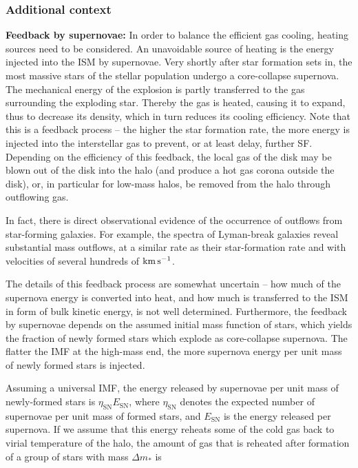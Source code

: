\documentclass[a4paper,10pt]{article}
\begin{document}
\subsubsection{Additional context}

{\noindent}\textbf{Feedback by supernovae:} In order to balance the efficient gas cooling, heating sources need to be considered. An unavoidable source of heating is the energy injected into the ISM by supernovae. Very shortly after star formation sets in, the most massive stars of the stellar population undergo a core-collapse supernova. The mechanical energy of the explosion is partly transferred to the gas surrounding the exploding star. Thereby the gas is heated, causing it to expand, thus to decrease its density, which in turn reduces its cooling efficiency. Note that this is a feedback process -- the higher the star formation rate, the more energy is injected into the interstellar gas to prevent, or at least delay, further SF. Depending on the efficiency of this feedback, the local gas of the disk may be blown out of the disk into the halo (and produce a hot gas corona outside the disk), or, in particular for low-mass halos, be removed from the halo through outflowing gas.

{\noindent}In fact, there is direct observational evidence of the occurrence of outflows from star-forming galaxies. For example, the spectra of Lyman-break galaxies reveal substantial mass outflows, at a similar rate as their star-formation rate and with velocities of several hundreds of ${\rm km\,s^{-1}}$.

{\noindent}The details of this feedback process are somewhat uncertain -- how much of the supernova energy is converted into heat, and how much is transferred to the ISM in form of bulk kinetic energy, is not well determined. Furthermore, the feedback by supernovae depends on the assumed initial mass function of stars, which yields the fraction of newly formed stars which explode as core-collapse supernova. The flatter the IMF at the high-mass end, the more supernova energy per unit mass of newly formed stars is injected.

{\noindent}Assuming a universal IMF, the energy released by supernovae per unit mass of newly-formed stars is $\eta_\mathrm{SN}E_\mathrm{SN}$, where $\eta_\mathrm{SN}$ denotes the expected number of supernovae per unit mass of formed stars, and $E_\mathrm{SN}$ is the energy released per supernova. If we assume that this energy reheats some of the cold gas back to virial temperature of the halo, the amount of gas that is reheated after formation of a group of stars with mass $\Delta m_*$ is
\end{document}
